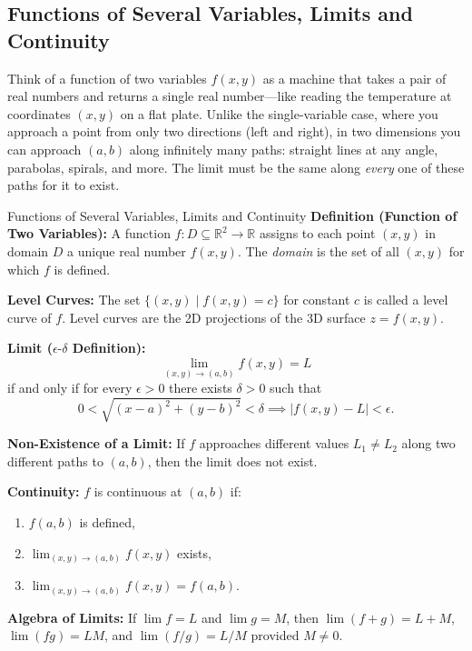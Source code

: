 \documentclass[12pt,a4paper]{article}
\begin{document}
\subsection{Functions of Several Variables, Limits and Continuity}

Think of a function of two variables \(f(x,y)\) as a machine that takes a pair of real numbers and returns a single real number---like reading the temperature at coordinates \((x,y)\) on a flat plate. Unlike the single-variable case, where you approach a point from only two directions (left and right), in two dimensions you can approach \((a,b)\) along infinitely many paths: straight lines at any angle, parabolas, spirals, and more. The limit must be the same along \emph{every} one of these paths for it to exist.

\begin{infobox}{Functions of Several Variables, Limits and Continuity}
\textbf{Definition (Function of Two Variables):} A function \(f: D \subseteq \mathbb{R}^2 \to \mathbb{R}\) assigns to each point \((x,y)\) in domain \(D\) a unique real number \(f(x,y)\). The \textit{domain} is the set of all \((x,y)\) for which \(f\) is defined.

\textbf{Level Curves:} The set \(\{(x,y) \mid f(x,y) = c\}\) for constant \(c\) is called a level curve of \(f\). Level curves are the 2D projections of the 3D surface \(z = f(x,y)\).

\textbf{Limit (\(\epsilon\text{-}\delta\) Definition):}
\[
\lim_{(x,y)\to(a,b)} f(x,y) = L
\]
if and only if for every \(\epsilon > 0\) there exists \(\delta > 0\) such that
\[
0 < \sqrt{(x-a)^2+(y-b)^2} < \delta \implies |f(x,y)-L| < \epsilon.
\]

\textbf{Non-Existence of a Limit:} If \(f\) approaches different values \(L_1 \neq L_2\) along two different paths to \((a,b)\), then the limit does not exist.

\textbf{Continuity:} \(f\) is continuous at \((a,b)\) if:
\begin{enumerate}
  \item \(f(a,b)\) is defined,
  \item \(\lim_{(x,y)\to(a,b)} f(x,y)\) exists,
  \item \(\lim_{(x,y)\to(a,b)} f(x,y) = f(a,b)\).
\end{enumerate}

\textbf{Algebra of Limits:} If \(\lim f = L\) and \(\lim g = M\), then \(\lim (f+g) = L+M\), \(\lim (fg) = LM\), and \(\lim (f/g) = L/M\) provided \(M \neq 0\).
\end{infobox}
\end{document}
